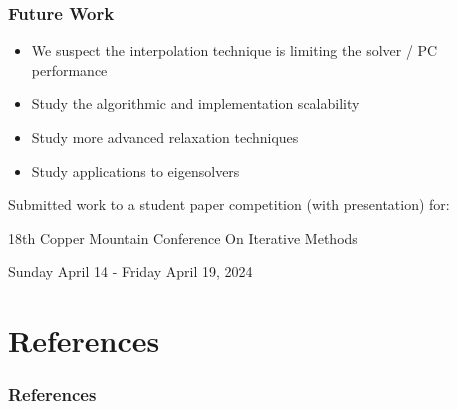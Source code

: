 \documentclass[xcolor=dvipsnames]{beamer}
\begin{document}
\begin{frame}
  \frametitle{Future Work}

  \begin{itemize}
    \item We suspect the interpolation technique is limiting the solver / PC performance 
    \item Study the algorithmic and implementation scalability
    \item Study more advanced relaxation techniques
    \item Study applications to eigensolvers
  \end{itemize}
  \vspace{1em}

  Submitted work to a student paper competition (with presentation) for:
  \vspace{1em}

18th Copper Mountain Conference On Iterative Methods

Sunday April 14 - Friday April 19, 2024
\end{frame}

\section{References}
\begin{frame}[allowframebreaks]
        \frametitle{References}
        
        
\end{frame}
\end{document}
